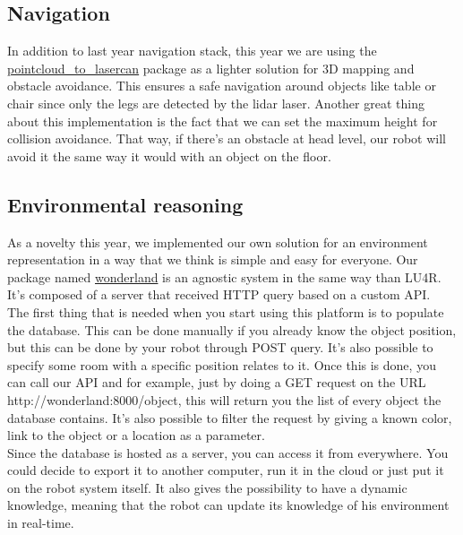 \documentclass[runningheads,a4paper]{llncs}
\begin{document}
\subsection{Navigation}
\tab In addition to last year navigation stack, this year we are using the \href{http://wiki.ros.org/pointcloud_to_laserscan}{pointcloud\_to\_lasercan} package as a lighter solution for 3D mapping and obstacle avoidance. This ensures a safe navigation around objects like table or chair since only the legs are detected by the lidar laser. Another great thing about this implementation is the fact that we can set the maximum height for collision avoidance. That way, if there’s an obstacle at head level, our robot will avoid it the same way it would with an object on the floor. \\

\subsection{Environmental reasoning}
\tab As a novelty this year, we implemented our own solution for an environment representation in a way that we think is simple and easy for everyone. Our package named \href{http://github.com/walkingmachine/wonderland}{wonderland} is an agnostic system in the same way than LU4R. It’s composed of a server that received HTTP query based on a custom API. \\

The first thing that is needed when you start using this platform is to populate the database. This can be done manually if you already know the object position, but this can be done by your robot through POST query. It’s also possible to specify some room with a specific position relates to it. Once this is done, you can call our API and for example, just by doing a GET request on the URL http://wonderland:8000/object, this will return you the list of every object the database contains. It’s also possible to filter the request by giving a known color, link to the object or a location as a parameter. \\

Since the database is hosted as a server, you can access it from everywhere. You could decide to export it to another computer, run it in the cloud or just put it on the robot system itself. It also gives the possibility to have a dynamic knowledge, meaning that the robot can update its knowledge of his environment in real-time. \\
\end{document}
